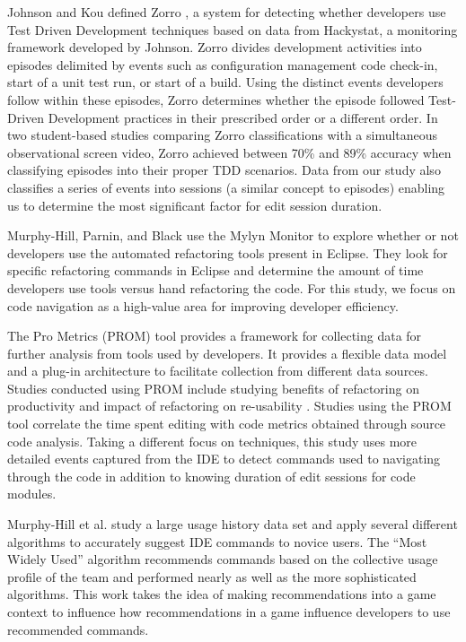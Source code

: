 \documentclass{sig-alternate}
\begin{document}
Johnson and Kou defined Zorro \cite{V:Johnson2007Automated}, a system for detecting whether developers use Test Driven Development techniques based on data from Hackystat, a monitoring framework developed by Johnson.  Zorro divides development activities into episodes delimited by events such as configuration management code check-in, start of a unit test run, or start of a build.  Using the distinct events developers follow within these episodes, Zorro determines whether the episode followed Test-Driven Development practices in their prescribed order or a different order. In two student-based studies comparing Zorro classifications with a simultaneous observational screen video, Zorro achieved between 70\% \cite{Kou2010Operational} and 89\% \cite{V:Johnson2007Automated} accuracy when classifying episodes into their proper TDD scenarios.  Data from our study also classifies a series of events into sessions (a similar concept to episodes) enabling us to determine the most significant factor for edit session duration.

Murphy-Hill, Parnin, and Black \cite{V:MurphyHill2012How} use the Mylyn Monitor to explore whether or not developers use the automated refactoring tools present in Eclipse.  They look for specific refactoring commands in Eclipse and determine the amount of time developers use tools versus hand refactoring the code.  For this study, we focus on code navigation as a high-value area for improving developer efficiency.

The Pro Metrics (PROM) tool provides a framework for collecting data for further analysis from tools used by developers.\cite{Coman2009Casestudy}  It provides a flexible data model and a plug-in architecture to facilitate collection from different data sources.  Studies conducted using PROM include studying benefits of refactoring on productivity \cite{Moser2008Case} and impact of refactoring on re-usability \cite{Moser2006Does}.  Studies using the PROM tool correlate the time spent editing with code metrics obtained through source code analysis.  Taking a different focus on techniques, this study uses more detailed events captured from the IDE to detect commands used to navigating through the code in addition to knowing duration of edit sessions for code modules.

Murphy-Hill et al. study a large usage history data set and apply several different algorithms to accurately suggest IDE commands to novice users\cite{MurphyHill2012Improving}.  The ``Most Widely Used'' algorithm recommends commands based on the collective usage profile of the team and performed nearly as well as the more sophisticated algorithms.  This work takes the idea of making recommendations into a game context to influence how recommendations in a game influence developers to use recommended commands.
\end{document}
